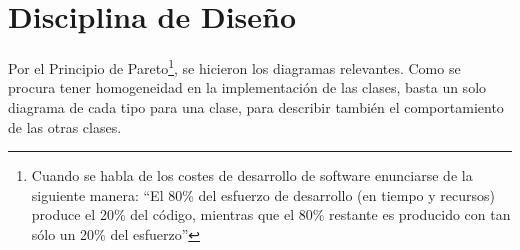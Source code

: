 
\chapter{Disciplina de Diseño}
\label{chap:disenio}

Por el Principio de Pareto\footnote{Cuando se habla de los costes de desarrollo de software enunciarse de la siguiente manera: ``El 80\% del esfuerzo de desarrollo (en tiempo y recursos) produce el 20\% del código, mientras que el 80\% restante es producido con tan sólo un 20\% del esfuerzo''}, se hicieron los diagramas relevantes. Como se procura tener homogeneidad en la implementación de las clases, basta un solo diagrama de cada tipo para una clase, para describir también el comportamiento de las otras clases.
    

